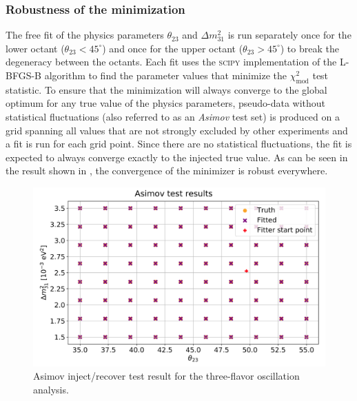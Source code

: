 \subsubsection{Robustness of the minimization}
\label{sec:three-flavor-inject-recover-test}
The free fit of the physics parameters $\theta_{23}$ and $\Delta m^2_{31}$ is run separately once for the lower octant ($\theta_{23} < 45^\circ$) and once for the upper octant ($\theta_{23} > 45^\circ$) to break the degeneracy between the octants. Each fit uses the \textsc{scipy}\cite{2020SciPy-NMeth} implementation of the \textsc{L-BFGS-B} algorithm\cite{l-bfgs-b} to find the parameter values that minimize the $\chi^2_{\mathrm{mod}}$ test statistic. To ensure that the minimization will always converge to the global optimum for any true value of the physics parameters, pseudo-data without statistical fluctuations (also referred to as an \emph{Asimov} test set) is produced on a grid spanning all values that are not strongly excluded by other experiments and a fit is run for each grid point. Since there are no statistical fluctuations, the fit is expected to always converge exactly to the injected true value. As can be seen in the result shown in , the convergence of the minimizer is robust everywhere. 
\begin{figure}
    \centering
    \includegraphics[width=0.9\linewidth]{figures/measurement/three_flavor/asimov_test/inject_recover_map.png}
    \caption{Asimov inject/recover test result for the three-flavor oscillation analysis.}
    \label{fig:three-flavor-asimov}
\end{figure}

